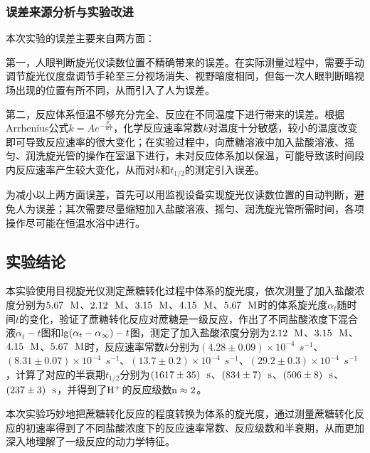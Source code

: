\documentclass[12pt]{article}
\begin{document}
 	 	\subsubsection{误差来源分析与实验改进}
本次实验的误差主要来自两方面：\par 
第一，人眼判断旋光仪读数位置不精确带来的误差。在实际测量过程中，需要手动调节旋光仪度盘调节手轮至三分视场消失、视野暗度相同，但每一次人眼判断暗视场出现的位置有所不同，从而引入了人为误差。\par 
第二，反应体系恒温不够充分完全、反应在不同温度下进行带来的误差。根据Arrhenius公式$k=Ae^{-\frac{E_{a}}{RT}}$，化学反应速率常数$k$对温度十分敏感，较小的温度改变即可导致反应速率的很大变化；在实验过程中，向蔗糖溶液中加入盐酸溶液、摇匀、润洗旋光管的操作在室温下进行，未对反应体系加以保温，可能导致该时间段内反应速率产生较大变化，从而对$k$和$t_{1/2}$的测定引入误差。\par 
为减小以上两方面误差，首先可以用监视设备实现旋光仪读数位置的自动判断，避免人为误差；其次需要尽量缩短加入盐酸溶液、摇匀、润洗旋光管所需时间，各项操作尽可能在恒温水浴中进行。


 	 \subsection{实验结论}
本实验使用目视旋光仪测定蔗糖转化过程中体系的旋光度，依次测量了加入盐酸浓度分别为$5.67\ \ {\rm M}$、$2.12 \ \ {\rm M}$、$3.15\ \ {\rm M}$、$4.15\ \ {\rm M}$、$5.67\ \ {\rm M}$时的体系旋光度$\alpha_{t}$随时间$t$的变化，验证了蔗糖转化反应对蔗糖是一级反应，作出了不同盐酸浓度下混合液$\alpha_{t}-t$图和${\rm lg}(\alpha_{t}-\alpha_{\infty})-t$图，测定了加入盐酸浓度分别为$2.12\ \ {\rm M}$、$3.15\ \ {\rm M}$、$4.15\ \ {\rm M}$、$5.67\ \ {\rm M}$时，反应速率常数$k$分别为$(4.28\pm 0.09)\times10^{-4}\ \ s^{-1}$、$(8.31\pm 0.07)\times10^{-4}\ \ s^{-1}$、$(13.7\pm 0.2)\times10^{-4}\ \ s^{-1}$、$(29.2\pm 0.3)\times10^{-4}\ \ s^{-1}$，计算了对应的半衰期$t_{1/2}$分别为$(1617\pm 35)\ \ {\rm s}$、$(834\pm 7)\ \ {\rm s}$、$(506\pm 8)\ \ {\rm s}$、$(237\pm 3) \ \ {\rm s}$，并得到了$\rm H^{+}$的反应级数$\rm n\approx2$。\par 
本次实验巧妙地把蔗糖转化反应的程度转换为体系的旋光度，通过测量蔗糖转化反应的初速率得到了不同盐酸浓度下的反应速率常数、反应级数和半衰期，从而更加深入地理解了一级反应的动力学特征。

 

   
\vbox{}
\vbox{}



\end{document}
